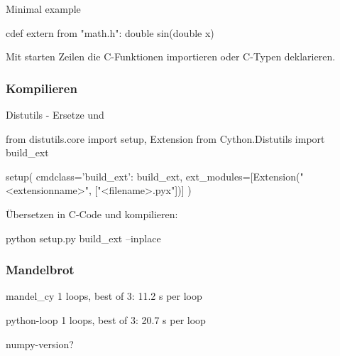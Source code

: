 \documentclass[hyperref={xetex}]{beamer}
\begin{document}
\begin{frame}[fragile]{Minimal example}

  \begin{pyin}
cdef extern from "math.h":
    double sin(double x)
  \end{pyin}

Mit  starten Zeilen die C-Funktionen importieren oder C-Typen deklarieren.

\end{frame}

\begin{frame}[fragile]\frametitle{Kompilieren}

Distutils - Ersetze  und 
  \begin{pyin}
from distutils.core import setup, Extension
from Cython.Distutils import build_ext

setup(
        cmdclass={'build_ext': build_ext},
        ext_modules=[Extension("<extensionname>", ["<filename>.pyx"])]
     )
  \end{pyin}
Übersetzen in C-Code und kompilieren:
  \begin{pyin}
python setup.py build_ext --inplace
  \end{pyin}

\end{frame}


\begin{frame}[fragile]\frametitle{Mandelbrot}
  mandel\_cy
  1 loops, best of 3: 11.2 s per loop

  python-loop
  1 loops, best of 3: 20.7 s per loop

  numpy-version?
\end{frame}
\end{document}
